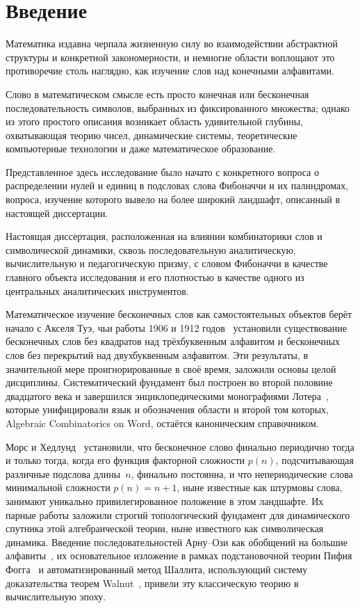 \documentclass[a4paper,14pt]{extreport}
\theoremstyle{plain}
\theoremstyle{definition}
\theoremstyle{remark}
\begin{document}
\chapter*{Введение}
	
	Математика издавна черпала жизненную силу во взаимодействии абстрактной структуры и конкретной закономерности, и немногие области воплощают это противоречие столь наглядно, как изучение слов над конечными алфавитами.  
	
	Слово в математическом смысле есть просто конечная или бесконечная последовательность символов, выбранных из фиксированного множества; однако из этого простого описания возникает область удивительной глубины, охватывающая теорию чисел, динамические системы, теоретические компьютерные технологии и даже математическое образование.
	
	Представленное здесь исследование было начато с конкретного вопроса о распределении нулей и единиц в подсловах слова Фибоначчи и их палиндромах, вопроса, изучение которого вывело на 
	более широкий ландшафт, описанный в настоящей диссертации.
	
	Настоящая диссертация, расположенная на влиянии комбинаторики слов и символической динамики, сквозь последовательную аналитическую, вычислительную и педагогическую призму, с словом Фибоначчи в качестве главного объекта исследования и его плотностью в качестве одного из центральных аналитических инструментов.
	
	Математическое изучение бесконечных слов как самостоятельных объектов берёт начало с Акселя Туэ, чьи работы 1906 и 1912 годов~\cite{Thue, Thue1912} установили существование бесконечных слов без квадратов над трёхбуквенным алфавитом и бесконечных слов без перекрытий над двухбуквенным алфавитом. Эти результаты, в значительной мере проигнорированные в своё время, заложили основы целой дисциплины. Систематический фундамент был построен во второй половине двадцатого века и завершился энциклопедическими монографиями Лотера~\cite{Lothaire1983, Lothaire2002},
	которые унифицировали язык и обозначения области и второй том которых, Algebraic Combinatorics on Word, остаётся каноническим справочником.
	
	Морс и Хедлунд~\cite{Morse, Morse1940} установили, что бесконечное слово финально периодично тогда и только тогда, когда его функция факторной сложности $p(n)$, подсчитывающая различные подслова длины~$n$, финально постоянна, и что непериодические слова минимальной сложности $p(n) = n+1$, ныне известные как штурмовы слова, занимают уникально привилегированное положение в этом ландшафте. Их парные работы заложили строгий топологический фундамент для динамического спутника этой алгебраической теории, ныне известного как символическая динамика. Введение последовательностей Арну--Ози как обобщений на большие алфавиты~\cite{Arnoux}, их основательное изложение в рамках подстановочной теории Пифия Фогга~\cite{Fogg} и автоматизированный метод Шаллита, использующий систему доказательства теорем Walnut~\cite{Shallit2022}, привели эту классическую теорию в вычислительную эпоху.
	
\end{document}

